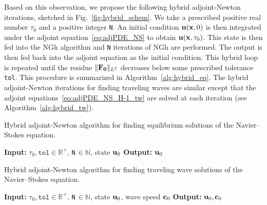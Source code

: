 \documentclass{jfm}
\begin{document}
Based on this observation, we propose the following hybrid adjoint-Newton iterations,
sketched in Fig.~\ref{fig:hybrid_schem}.
We take
a prescribed positive real number $\tau_0$ and a positive integer \texttt{N}. An initial
condition $\mathbf u(\mathbf x,0)$ is then integrated under the adjoint equation~\eqref{eq:adjPDE_NS} to
obtain $\mathbf u(\mathbf x,\tau_0)$. This state is then fed into the NGh algorithm and \texttt{N}
iterations of NGh are performed. The output is then fed back into the adjoint equation
as the initial condition. This hybrid loop is repeated until the residue $\|\mathbf F_{\mathbf 0}\|_{L^2}$
decreases below some prescribed tolerance \texttt{tol}. This procedure is summarized
in Algorithm~\ref{alg:hybrid_eq}.
The hybrid adjoint-Newton iterations for finding traveling waves are similar except
that the adjoint equations~\eqref{eq:adjPDE_NS_H-1_tw} are solved at each iteration
(see Algorithm~\ref{alg:hybrid_tw}).
\begin{algorithm}
\DontPrintSemicolon
\caption{Hybrid adjoint-Newton algorithm for finding equilibrium solutions of the
Navier--Stokes equation.}
\textbf{Input:} $\tau_0,\texttt{tol}\in\mathbb R^+$,
\texttt{N}$\,\in\mathbb N$, state $\mathbf
u_0$\;
\textbf{Output:} $\mathbf u_0$
\label{alg:hybrid_eq}
\end{algorithm}
%
\begin{algorithm}
\DontPrintSemicolon
\caption{Hybrid adjoint-Newton algorithm for finding traveling wave solutions of the
Navier--Stokes equation.}
\textbf{Input:} $\tau_0,\texttt{tol}\in\mathbb R^+$,
\texttt{N}$\,\in\mathbb N$, state $\mathbf u_0$, wave speed $\mathbf c_0$\;
\textbf{Output:} $\mathbf u_0, \mathbf c_0$
\label{alg:hybrid_tw}
\end{algorithm}
\end{document}
